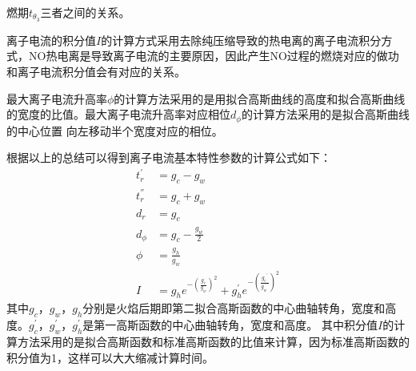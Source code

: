 燃期$t_{\theta_3}$三者之间的关系。\par
离子电流的积分值$I$的计算方式采用去除纯压缩导致的热电离的离子电流积分方式，NO热电离是导致离子电流的主要原因，因此产生NO过程的燃烧对应的做功和离子电流积分值会有对应的关系。\par
最大离子电流升高率$\phi$的计算方法采用的是用拟合高斯曲线的高度和拟合高斯曲线的宽度的比值。最大离子电流升高率对应相位$d_{\phi}$的计算方法采用的是拟合高斯曲线的中心位置
向左移动半个宽度对应的相位。\par
根据以上的总结可以得到离子电流基本特性参数的计算公式如下：
\begin{align}
	t_{r}^{'} &= g_{c}-g_{w}\\
	t_{r}^{''} &= g_{c}+g_{w}\\
	d_{r} &= g_{c}\\
	d_{\phi} &= g_{c}-\frac{g_w}{2}\\
	\phi &= \frac{g_{h}}{g_{w}}\\
	I &= g_{h}e^{-(\frac{g_c}{g_w})^2}+g_{h}^{'}e^{-(\frac{{g_c}^{'}}{{g_w}^{'}})^2}
\end{align}
其中$g_{c}$，$g_w$，$g_h$分别是火焰后期即第二拟合高斯函数的中心曲轴转角，宽度和高度。$g_{c}^{'}$，$g_w^{'}$，$g_h^{'}$是第一高斯函数的中心曲轴转角，宽度和高度。
其中积分值$I$的计算方法采用的是拟合高斯函数和标准高斯函数的比值来计算，因为标准高斯函数的积分值为1，这样可以大大缩减计算时间。
